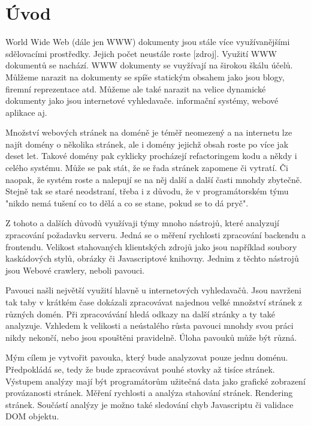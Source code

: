 
\chapter{Úvod}
World Wide Web (dále jen WWW) dokumenty jsou stále více využívanějšími sdělovacími prostředky. Jejich počet neustále roste [zdroj]. Využití WWW dokumentů se nachází. WWW dokumenty se vuyžívají na širokou škálu účelů. Můlžeme narazit na dokumenty se spíše statickým obsahem jako jsou blogy, firemní reprezentace atd. Můžeme ale také narazit na velice dynamické dokumenty jako jsou internetové vyhledavače. informační systémy, webové aplikace aj. 

Množství webových stránek na doméně je téměř neomezený a na internetu lze najít domény o několika stránek, ale i domény jejichž obsah roste po více jak deset let. Takové domény pak cyklicky procházejí refactoringem kodu a někdy i celého systému. Může se pak stát, že se řada stránek zapomene či vytratí. Či naopak, že systém roste a nalepují se na něj další a další časti mnohdy zbytečně. Stejně tak se staré neodstraní, třeba i z důvodu, že v programátorském týmu "nikdo nemá tušení co to dělá a co se stane, pokud se to dá pryč". 

Z tohoto a dalších důvodů využívaji týmy mnoho nástrojů, které analyzují zpracování požadavku serveru. Jedná se o měření rychlosti zpracování backendu a frontendu. Velikost stahovaných klientských zdrojů jako jsou například soubory kaskádových stylů, obrázky či Javascriptové knihovny. Jednim z těchto nástrojů jsou Webové crawlery, neboli pavouci. 

Pavouci našli největší využití hlavně u internetových vyhledavačů. Jsou navrženi tak taby v krátkém čase dokázali zpracovávat najednou velké množství stránek z různých domén. Při zpracovávání hledá odkazy na další stránky a ty také analyzuje. Vzhledem k velikosti a neústalého růsta pavouci mnohdy svou práci nikdy nekončí, nebo jsou spouštěni pravidelně. Úloha pavouků může být různá. 

Mým cílem je vytvořit pavouka, který bude analyzovat pouze jednu doménu. Předpokládá se, tedy že bude zpracovávat pouhé stovky až tisíce stránek. Výstupem analýzy mají být programátorům užitečná data jako grafické zobrazení provázanosti stránek. Měření rychlosti a analýza stahování stránek. Rendering stránek. Součástí analýzy je možno také sledování chyb Javascriptu či validace DOM objektu.

